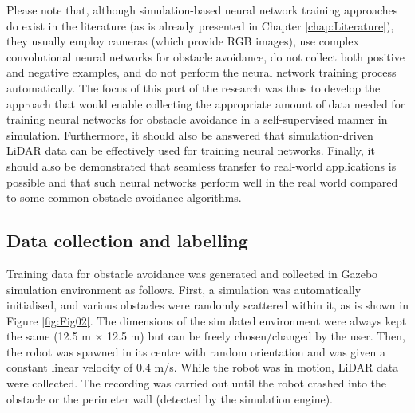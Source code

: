 Please note that, although simulation-based neural network training approaches do exist in the literature (as is already presented in Chapter \ref{chap:Literature}), they usually employ cameras (which provide RGB images), use complex convolutional neural networks for obstacle avoidance, do not collect both positive and negative examples, and do not perform the neural network training process automatically. The focus of this part of the research was thus to develop the approach that would enable collecting the appropriate amount of data needed for training neural networks for obstacle avoidance in a self-supervised manner in simulation. Furthermore, it should also be answered that simulation-driven LiDAR data can be effectively used for training neural networks. Finally, it should also be demonstrated that seamless transfer to real-world applications is possible and that such neural networks perform well in the real world compared to some common obstacle avoidance algorithms.

\subsection{Data collection and labelling}

Training data for obstacle avoidance was generated and collected in Gazebo simulation environment \cite{Koenig2004} as follows. First, a simulation was automatically initialised, and various obstacles were randomly scattered within it, as is shown in Figure \ref{fig:Fig02}. The dimensions of the simulated environment were always kept the same (12.5 m $\times$ 12.5 m) but can be freely chosen/changed by the user. Then, the robot was spawned in its centre with random orientation and was given a constant linear velocity of 0.4 m/s. While the robot was in motion, LiDAR data were collected. The recording was carried out until the robot crashed into the obstacle or the perimeter wall (detected by the simulation engine).

